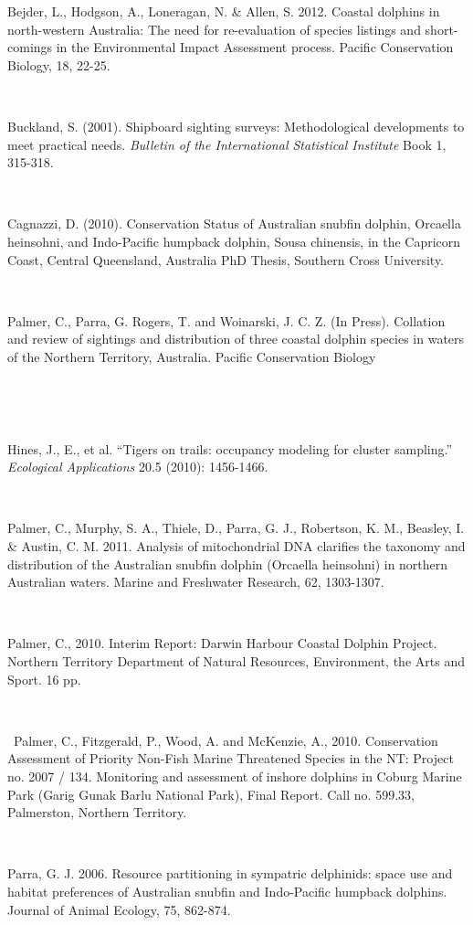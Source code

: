 \documentclass[version=last,
    paper=a4,                               %
    10pt,                                   %
    dvipsnames,
    oneside,                              %
    headings=openany,                       %
    open=any,
    BCOR=7mm,                               %
    DIV=15,     %
]{scrbook}
\begin{document}
Bejder, L., Hodgson, A., Loneragan, N. \& Allen, S. 2012. Coastal
dolphins in north-western Australia: The need for re-evaluation of
species listings and short-comings in the Environmental Impact
Assessment process. Pacific Conservation Biology, 18, 22-25.

~

Buckland, S. (2001). Shipboard sighting surveys: Methodological
developments to meet practical needs. \emph{Bulletin of the
International Statistical Institute} Book 1, 315-318.

~

Cagnazzi, D. (2010). Conservation Status of Australian snubfin dolphin,
Orcaella heinsohni, and Indo-Pacific humpback dolphin, Sousa chinensis,
in the Capricorn Coast, Central Queensland, Australia PhD Thesis,
Southern Cross University.

~

Palmer, C., Parra, G. Rogers, T. and Woinarski, J. C. Z. (In Press).
Collation and review of sightings and distribution of three coastal
dolphin species in waters of the Northern Territory, Australia. Pacific
Conservation Biology

~

~

Hines, J., E., et al. ``Tigers on trails: occupancy modeling for cluster
sampling.'' \emph{Ecological Applications} 20.5 (2010): 1456-1466.

~

Palmer, C., Murphy, S. A., Thiele, D., Parra, G. J., Robertson, K. M.,
Beasley, I. \& Austin, C. M. 2011. Analysis of mitochondrial DNA
clarifies the taxonomy and distribution of the Australian snubfin
dolphin (Orcaella heinsohni) in northern Australian waters. Marine and
Freshwater Research, 62, 1303-1307.

~

Palmer, C., 2010. Interim Report: Darwin Harbour Coastal Dolphin
Project. Northern Territory Department of Natural Resources,
Environment, the Arts and Sport. 16 pp.

~

~Palmer, C., Fitzgerald, P., Wood, A. and McKenzie, A., 2010.
Conservation Assessment of Priority Non-Fish Marine Threatened Species
in the NT: Project no. 2007 / 134. Monitoring and assessment of inshore
dolphins in Coburg Marine Park (Garig Gunak Barlu National Park), Final
Report. Call no. 599.33, Palmerston, Northern Territory.

~

Parra, G. J. 2006. Resource partitioning in sympatric delphinids: space
use and habitat preferences of Australian snubfin and Indo-Pacific
humpback dolphins. Journal of Animal Ecology, 75, 862-874.
\end{document}
